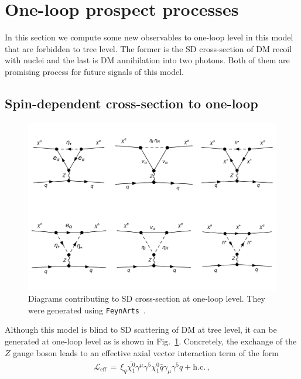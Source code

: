 \documentclass[12pt,letterpaper]{article}
\begin{document}
\section{One-loop prospect processes}
\label{sec:1-loop-processes}

In this section we compute some new observables to one-loop level in this model that are forbidden to tree level. The former is the SD cross-section of DM recoil with nuclei and the last is DM annihilation into two photons. Both of them are promising process for future signals of this model.

\subsection{Spin-dependent cross-section to one-loop}
\label{sec:sigma-SD}
%
\begin{figure}[h]
\begin{center}
\includegraphics[scale=0.45]{SD-diagrams}
\caption{ Diagrams contributing to SD cross-section at one-loop level. They were generated using \texttt{FeynArts}~\cite{Hahn:2000kx}. }
\label{fig:SD}
\end{center}
\end{figure}
%
Although this model is blind to SD scattering of DM at tree level, it can be generated at one-loop level as is shown in Fig.~\ref{fig:SD}. 
Concretely,  the exchange of the  $Z$ gauge boson leads to an effective axial vector interaction term of the form~\cite{Jungman:1995df, Ibarra:2016dlb}
%
\begin{align}
\label{eq:LSD-eff}
\mathcal{L}_{\text{eff}}\, =\, \xi_q \bar{\chi^0_1}\gamma^{\mu}\gamma^5 \chi^0_1 \bar{q}\gamma_{\mu}\gamma^5q + \text{h.c.}\,,
\end{align}
\end{document}
